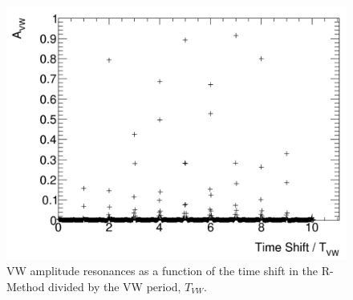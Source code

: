 \documentclass[12pt,letterpaper]{article}
\begin{document}
\begin{figure}[]
    \centering
    \includegraphics[width=.7\textwidth]{JamesAnalytic_Avw_Resonances}
    \caption[]{VW amplitude resonances as a function of the time shift in the R-Method divided by the VW period, $T_{VW}$.}
    \label{fig:JamesAnalytic_Avw_Resonances}
\end{figure}
\end{document}
